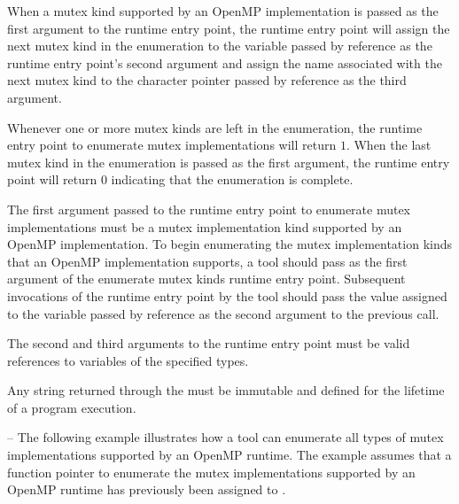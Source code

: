 \begin{comment}
For that reason, a user program can provide hints
to help the runtime system to select appropriate implementations.
When a lock or nest lock is initialized, the \code{ompt\_callback\_init\_lock}
callback receives the argument \code{kind}---a small integer that
indicates the lock implementation chosen by the OpenMP runtime.
Similarly, the \code{ompt\_callback\_mutex\_acquire} callback receives
the argument \code{kind} to indicate the implementation of a lock,
critical section, atomic region, or ordered section. 
\end{comment}

When a mutex kind supported by an OpenMP implementation is passed
as the first argument to the runtime entry point,
the runtime entry point will assign the next mutex kind in the enumeration to
the variable passed by reference as the runtime entry point's second argument
and assign the name associated with the next mutex kind 
to the character pointer passed by reference as the third argument.

Whenever one or more mutex kinds are left in the enumeration, 
the runtime entry point to enumerate mutex implementations will return $1$.
When the last mutex kind in the enumeration is passed 
as the first argument, the runtime entry point will return $0$ 
indicating that the enumeration is complete.

\constraints
The first argument passed to the runtime entry point to enumerate mutex implementations must be
a mutex implementation kind supported
by an OpenMP implementation.  To begin enumerating the mutex
implementation kinds that an OpenMP implementation supports, a tool
should pass  as the first
argument of the enumerate mutex kinds runtime entry point.  Subsequent invocations
of the runtime entry point by the tool should pass the
value assigned to the variable passed by reference as the second
argument to the previous call.

The second and third arguments to the runtime entry point must be valid
references to variables of the specified types.

Any string returned through the \callbackarg{}
 must be immutable and defined 
for the lifetime of a program execution.

\notestart
\noteheader -- The following example illustrates how a tool can 
enumerate all types of mutex implementations supported by an OpenMP runtime.
The example assumes that a function pointer to enumerate
the mutex implementations supported by an OpenMP runtime 
has previously been assigned to .
\vspace{2ex}

